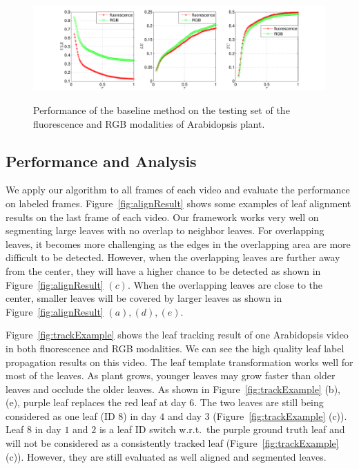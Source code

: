 \begin{figure}
\centering
\includegraphics[trim= 10 0 0 10, clip, width=.81\textwidth]{Figures/performance_fmp_rgb.pdf}\\
\caption{Performance of the baseline method on the testing set of the fluorescence and RGB modalities of Arabidopsis plant.}
\label{fig:performance}
\end{figure}


\subsection{Performance and Analysis}
We apply our algorithm to all frames of each video and evaluate the performance on labeled frames.
Figure~\ref{fig:alignResult} shows some examples of leaf alignment results on the last frame of each video.
Our framework works very well on segmenting large leaves with no overlap to neighbor leaves.
For overlapping leaves, it becomes more challenging as the edges in the overlapping area are more difficult to be detected.
However, when the overlapping leaves are further away from the center, they will have a higher chance to be detected as shown in Figure~\ref{fig:alignResult} $(c)$.
When the overlapping leaves are close to the center, smaller leaves will be covered by larger leaves as shown in Figure~\ref{fig:alignResult} $(a), (d), (e)$.

Figure~\ref{fig:trackExample} shows the leaf tracking result of one Arabidopsis video in both fluorescence and RGB modalities.
We can see the high quality leaf label propagation results on this video.
The leaf template transformation works well for most of the leaves.
As plant grows, younger leaves may grow faster than older leaves and occlude the older leaves.
As shown in Figure~\ref{fig:trackExample} (b),(e), purple leaf replaces the red leaf at day $6$.
The two leaves are still being considered as one leaf (ID $8$) in day $4$ and day $3$ (Figure~\ref{fig:trackExample} (c)).
Leaf $8$ in day $1$ and $2$ is a leaf ID switch w.r.t.~the purple ground truth leaf and will not be considered as a consistently tracked leaf (Figure~\ref{fig:trackExample} (c)).
However, they are still evaluated as well aligned and segmented leaves.

